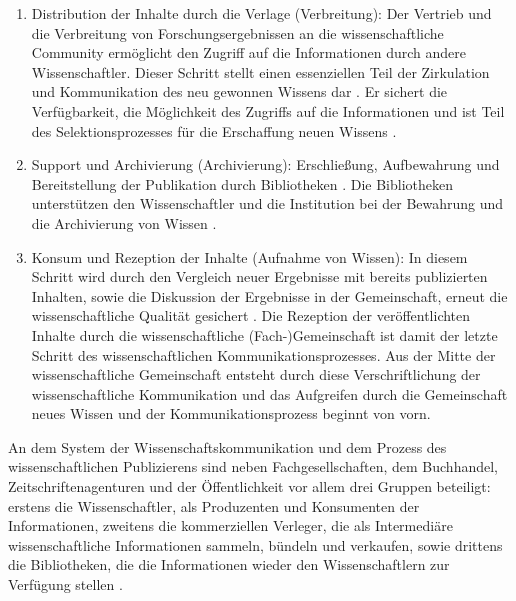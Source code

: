 \begin{enumerate}
\item Distribution der Inhalte durch die Verlage (Verbreitung):
Der Vertrieb und die Verbreitung von Forschungsergebnissen an die wissenschaftliche Community ermöglicht den Zugriff auf die Informationen durch andere Wissenschaftler. Dieser Schritt stellt einen essenziellen Teil der Zirkulation und Kommunikation des neu gewonnen Wissens dar \cite{cite:11i}. Er sichert die Verfügbarkeit, die Möglichkeit des Zugriffs auf die Informationen und ist Teil des Selektionsprozesses für die Erschaffung neuen Wissens \cite{cite:11l}.
\item Support und Archivierung (Archivierung): Erschließung, Aufbewahrung und Bereitstellung der Publikation durch Bibliotheken \cite{schirmbacher_2009_wisspub}. Die Bibliotheken unterstützen den Wissenschaftler und die Institution bei der Bewahrung und die Archivierung von Wissen \cite{K_lbel_2002}.
\item Konsum und Rezeption der Inhalte (Aufnahme von Wissen): In diesem Schritt wird durch den Vergleich neuer Ergebnisse mit bereits publizierten Inhalten, sowie die Diskussion der Ergebnisse in der Gemeinschaft, erneut die wissenschaftliche Qualität gesichert \cite{umstatter_2007_qualitatssicherung}. Die Rezeption der veröffentlichten Inhalte durch die wissenschaftliche (Fach-)Gemeinschaft ist damit der letzte Schritt des wissenschaftlichen Kommunikationsprozesses. Aus der Mitte der wissenschaftliche Gemeinschaft entsteht durch diese Verschriftlichung der wissenschaftliche Kommunikation und das Aufgreifen durch die Gemeinschaft neues Wissen \cite{cite:11k} \cite{schirmbacher_2009_wisspub} und der Kommunikationsprozess beginnt von vorn.
\end{enumerate}

An dem System der Wissenschaftskommunikation und dem Prozess des wissenschaftlichen Publizierens sind neben Fachgesellschaften, dem Buchhandel, Zeitschriftenagenturen und der Öffentlichkeit \cite[:6]{seidenfaden_2005_kommunikation} vor allem drei Gruppen beteiligt: erstens die Wissenschaftler, als Produzenten und Konsumenten der Informationen, zweitens die kommerziellen Verleger, die als Intermediäre wissenschaftliche Informationen sammeln, bündeln und verkaufen, sowie drittens die Bibliotheken, die die Informationen wieder den Wissenschaftlern zur Verfügung stellen \cite{Odlyzko_1997}.

